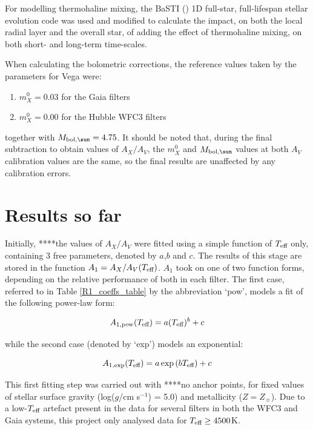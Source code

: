 \documentclass[usenatbib]{mnras}
\begin{document}
For modelling thermohaline mixing, the BaSTI (\citet{2004ApJ...612..168P}) 1D full-star, full-lifespan stellar evolution code was used and modified to calculate the impact, on both the local radial layer and the overall star, of adding the effect of thermohaline mixing, on both short- and long-term time-scales.

When calculating the bolometric corrections, the reference values taken by the parameters for Vega were:
\begin{enumerate}
\item $m_{X}^{0} = 0.03$ for the Gaia filters
\item $m_{X}^{0} = 0.00$ for the Hubble WFC3 filters
\end{enumerate}

together with $M_{\textnormal{bol},\sun} = 4.75$. It should be noted that, during the final subtraction to obtain values of $A_{X}/A_{V}$, the $m_{X}^{0}$ and $M_{\textnormal{bol},\sun}$ values at both $A_{V}$ calibration values are the same, so the final results are unaffected by any calibration errors.

\section{Results so far}



Initially, ****the values of $A_{X}/A_{V}$ were fitted using a simple function of $T_{\textnormal{eff}}$ only, containing 3 free parameters, denoted by $a$,$b$ and $c$. The results of this stage are stored in the function $A_{1} = A_{X}/A_{V}(T_{\textnormal{eff}})$. $A_{1}$ took on one of two function forms, depending on the relative performance of both in each filter. The first case, referred to in Table \ref{R1_coeffs_table} by the abbreviation `pow', models a fit of the following power-law form:

\begin{equation}
A_{1,\textnormal{pow}} (T_{\textnormal{eff}}) = a (T_{\textnormal{eff}})^{b} + c
\label{Teff_pow}
\end{equation}

while the second case (denoted by `exp') models an exponential:

\begin{equation}
A_{1,\textnormal{exp}} (T_{\textnormal{eff}}) = a \exp{(b T_{\textnormal{eff}})} + c
\label{Teff_exp}
\end{equation}

This first fitting step was carried out with ****no anchor points, for  fixed values of stellar surface gravity (log($g$/cm s$^{-1}$) = 5.0) and metallicity ($Z = Z_{\sun}$). Due to a low-$T_{\textnormal{eff}}$ artefact present in the data for several filters in both the WFC3 and Gaia systems, this project only analysed data for $T_{\textnormal{eff}} \geq 4500$K.
\end{document}
